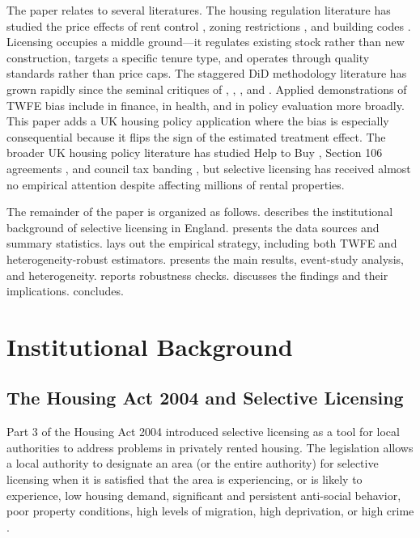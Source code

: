 \documentclass[12pt]{article}
\begin{document}
The paper relates to several literatures. The housing regulation literature has studied the price effects of rent control \citep{diamond2019effects, autor2014housing}, zoning restrictions \citep{glaeser2005urban, turner2014housing}, and building codes \citep{brueckner2011government}. Licensing occupies a middle ground---it regulates existing stock rather than new construction, targets a specific tenure type, and operates through quality standards rather than price caps. The staggered DiD methodology literature has grown rapidly since the seminal critiques of \citet{goodman2021difference}, \citet{de2020two}, \citet{borusyak2024revisiting}, and \citet{sun2021estimating}. Applied demonstrations of TWFE bias include \citet{baker2022much} in finance, \citet{marcus2021role} in health, and \citet{wing2024designing} in policy evaluation more broadly. This paper adds a UK housing policy application where the bias is especially consequential because it flips the sign of the estimated treatment effect. The broader UK housing policy literature has studied Help to Buy \citep{carozzi2024help}, Section 106 agreements \citep{whitehead2015planning}, and council tax banding \citep{lyytikäinen2012tax}, but selective licensing has received almost no empirical attention despite affecting millions of rental properties.

The remainder of the paper is organized as follows.  describes the institutional background of selective licensing in England.  presents the data sources and summary statistics.  lays out the empirical strategy, including both TWFE and heterogeneity-robust estimators.  presents the main results, event-study analysis, and heterogeneity.  reports robustness checks.  discusses the findings and their implications.  concludes.


\section{Institutional Background}
\label{sec:background}

\subsection{The Housing Act 2004 and Selective Licensing}

Part 3 of the Housing Act 2004 introduced selective licensing as a tool for local authorities to address problems in privately rented housing. The legislation allows a local authority to designate an area (or the entire authority) for selective licensing when it is satisfied that the area is experiencing, or is likely to experience, low housing demand, significant and persistent anti-social behavior, poor property conditions, high levels of migration, high deprivation, or high crime \citep{housingact2004}.
\end{document}
